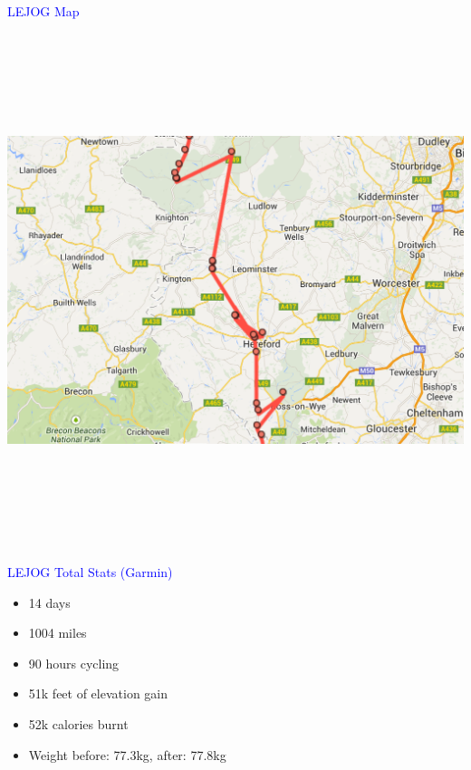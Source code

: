 \documentclass[landscape]{slides}
\begin{document}
\begin{slide}

    \textcolor{blue}{\Large{LEJOG Map}}

    \begin{center}
        \includegraphics[height=15cm]{lejog-sparse}
    \end{center}


\end{slide}


\begin{slide}

    \textcolor{blue}{\Large{LEJOG Total Stats (Garmin)}}

    \begin{itemize}
        \item 14 days
        \item 1004 miles
        \item 90 hours cycling
        \item 51k feet of elevation gain
        \item 52k calories burnt
        \item Weight before: 77.3kg, after: 77.8kg
    \end{itemize}

\end{slide}
\end{document}
